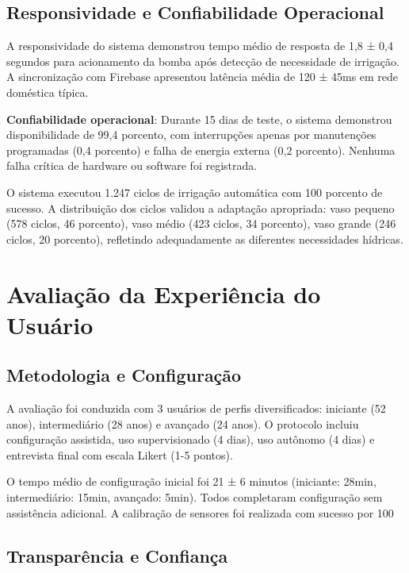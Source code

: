 \documentclass[oneside,english,brazilian]{UNISINOSmonografia}
\begin{document}
\subsection{Responsividade e Confiabilidade Operacional}

A responsividade do sistema demonstrou tempo médio de resposta de 1,8 ± 0,4 segundos para acionamento da bomba após detecção de necessidade de irrigação. A sincronização com Firebase apresentou latência média de 120 ± 45ms em rede doméstica típica.

\textbf{Confiabilidade operacional}: Durante 15 dias de teste, o sistema demonstrou disponibilidade de 99,4 porcento, com interrupções apenas por manutenções programadas (0,4 porcento) e falha de energia externa (0,2 porcento). Nenhuma falha crítica de hardware ou software foi registrada.

O sistema executou 1.247 ciclos de irrigação automática com 100 porcento de sucesso. A distribuição dos ciclos validou a adaptação apropriada: vaso pequeno (578 ciclos, 46 porcento), vaso médio (423 ciclos, 34 porcento), vaso grande (246 ciclos, 20 porcento), refletindo adequadamente as diferentes necessidades hídricas.

\section{Avaliação da Experiência do Usuário}

\subsection{Metodologia e Configuração}

A avaliação foi conduzida com 3 usuários de perfis diversificados: iniciante (52 anos), intermediário (28 anos) e avançado (24 anos). O protocolo incluiu configuração assistida, uso supervisionado (4 dias), uso autônomo (4 dias) e entrevista final com escala Likert (1-5 pontos).

O tempo médio de configuração inicial foi 21 ± 6 minutos (iniciante: 28min, intermediário: 15min, avançado: 5min). Todos completaram configuração sem assistência adicional. A calibração de sensores foi realizada com sucesso por 100%

\subsection{Transparência e Confiança}
\end{document}

